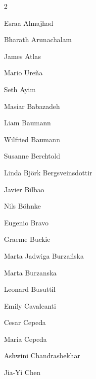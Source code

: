 \newchapter{\BrochureAuthors}
\label{authors}

\begin{multicols}{2}
 
 \ifdefined\AuthorAlmajhadEsraa {} Esraa Almajhad\fi

 \ifdefined\AuthorArunachalamBharath {} Bharath Arunachalam\fi
 
 \ifdefined\AuthorAtlasJames {} James Atlas\fi
 
 \ifdefined\AuthorAuthorUrenaMario {} Mario Ureña\fi
 
 \ifdefined\AuthorAyimSeth {} Seth Ayim\fi
 
 \ifdefined\AuthorBabazadehMasiar {} Masiar Babazadeh\fi
 
 \ifdefined\AuthorBaumannLiam {} Liam Baumann\fi
 
 \ifdefined\AuthorBaumannWilfried {} Wilfried Baumann\fi
 
 \ifdefined\AuthorBerchtoldSusanne {} Susanne Berchtold\fi
 
 \ifdefined\AuthorBergsveinsdottirBjorkLinda {} Linda Björk Bergsveinsdottir\fi
 
 \ifdefined\AuthorBilbaoJavier {} Javier Bilbao\fi
 
 \ifdefined\AuthorBohnkeNils {} Nils Böhnke\fi
 
 \ifdefined\AuthorBravoEugenio {} Eugenio Bravo\fi
 
 \ifdefined\AuthorBuckieGraeme {} Graeme Buckie\fi
 
 \ifdefined\AuthorBurzanskaJadwigaMarta {} Marta Jadwiga Burzańska\fi
 
 \ifdefined\AuthorBurzanskaMarta {} Marta Burzanska\fi
 
 \ifdefined\AuthorBusuttilLeonard {} Leonard Busuttil\fi
 
 \ifdefined\AuthorCavalcantiEmily {} Emily Cavalcanti\fi
 
 \ifdefined\AuthorCepedaCesar {} Cesar Cepeda\fi
 
 \ifdefined\AuthorCepedaMaria {} Maria Cepeda\fi
 
 \ifdefined\AuthorChandrashekharAshwini {} Ashwini Chandrashekhar\fi
 
 \ifdefined\AuthorChenJiaYi {} Jia-Yi Chen\fi
 

\end{multicols}
